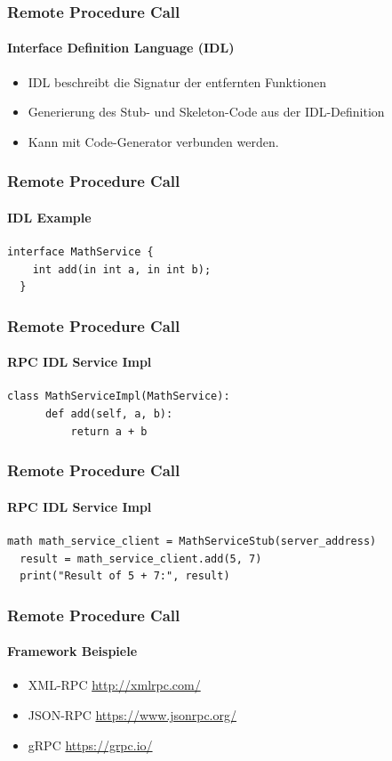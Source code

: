 \begin{frame}
  \frametitle{Remote Procedure Call}
  \framesubtitle{ Interface Definition Language (IDL)}
  \begin{itemize} 
  \item IDL beschreibt die Signatur der entfernten Funktionen
  \item Generierung des Stub- und Skeleton-Code aus der IDL-Definition
  \item Kann mit Code-Generator verbunden werden.
  \end{itemize} 
\end{frame}

\begin{frame}[fragile]
  \frametitle{Remote Procedure Call}
  \framesubtitle{IDL Example}
  \begin{minipage}{\textwidth}
  \begin{lstlisting}[caption={IDL Example},captionpos=b,label={lst:idl-example}]
  interface MathService {
    int add(in int a, in int b);
  }
  \end{lstlisting}
  \end{minipage}
\end{frame}

\begin{frame}[fragile]
  \frametitle{Remote Procedure Call}
  \framesubtitle{RPC IDL Service Impl}
  \begin{minipage}{\textwidth}
  \begin{lstlisting}[caption={RPC IDL Service Impl},captionpos=b,label={lst:idl-impl}]
  class MathServiceImpl(MathService):
      def add(self, a, b):
          return a + b
  \end{lstlisting}
  \end{minipage}
\end{frame}

\begin{frame}[fragile]
  \frametitle{Remote Procedure Call}
  \framesubtitle{RPC IDL Service Impl}
  \begin{minipage}{\textwidth}
  \begin{lstlisting}[caption={RPC IDL Service Impl},captionpos=b,label={lst:idl-impl-service}]
  math math_service_client = MathServiceStub(server_address)
  result = math_service_client.add(5, 7)
  print("Result of 5 + 7:", result)
  \end{lstlisting}
  \end{minipage}
\end{frame}

\begin{frame}
  \frametitle{Remote Procedure Call}
  \framesubtitle{Framework Beispiele}
  \begin{itemize} 
  \item XML-RPC \url{http://xmlrpc.com/}
  \item JSON-RPC \url{https://www.jsonrpc.org/}
  \item gRPC \url{https://grpc.io/}
  \end{itemize} 
\end{frame}

